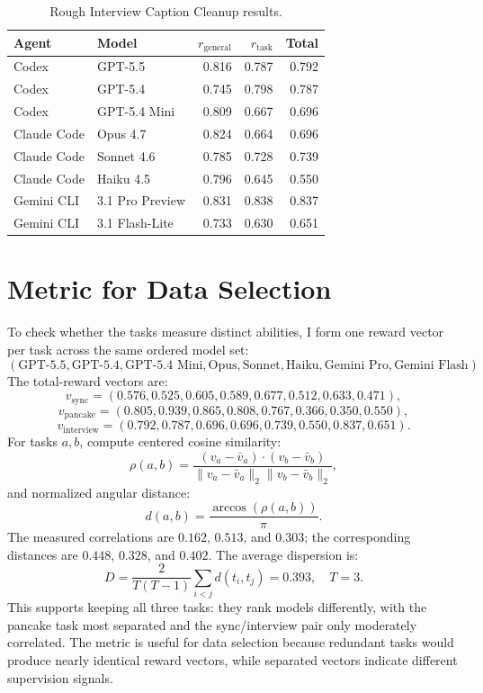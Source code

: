 \documentclass[11pt]{article}
\begin{document}
\begin{table}[H]
\centering
\small
\begin{tabular}{llrrr}
\toprule
Agent & Model & \(r_{\mathrm{general}}\) & \(r_{\mathrm{task}}\) & Total \\
\midrule
Codex & GPT-5.5 & 0.816 & 0.787 & 0.792 \\
Codex & GPT-5.4 & 0.745 & 0.798 & 0.787 \\
Codex & GPT-5.4 Mini & 0.809 & 0.667 & 0.696 \\
Claude Code & Opus 4.7 & 0.824 & 0.664 & 0.696 \\
Claude Code & Sonnet 4.6 & 0.785 & 0.728 & 0.739 \\
Claude Code & Haiku 4.5 & 0.796 & 0.645 & 0.550 \\
Gemini CLI & 3.1 Pro Preview & 0.831 & 0.838 & 0.837 \\
Gemini CLI & 3.1 Flash-Lite & 0.733 & 0.630 & 0.651 \\
\bottomrule
\end{tabular}
\caption{Rough Interview Caption Cleanup results.}
\end{table}

\section{Metric for Data Selection}

To check whether the tasks measure distinct abilities, I form one reward vector per task across the same ordered model set:
\[
( \text{GPT-5.5}, \text{GPT-5.4}, \text{GPT-5.4 Mini}, \text{Opus}, \text{Sonnet}, \text{Haiku}, \text{Gemini Pro}, \text{Gemini Flash} ).
\]
The total-reward vectors are:
\[
v_{\mathrm{sync}}=(0.576,0.525,0.605,0.589,0.677,0.512,0.633,0.471),
\]
\[
v_{\mathrm{pancake}}=(0.805,0.939,0.865,0.808,0.767,0.366,0.350,0.550),
\]
\[
v_{\mathrm{interview}}=(0.792,0.787,0.696,0.696,0.739,0.550,0.837,0.651).
\]
For tasks \(a,b\), compute centered cosine similarity:
\[
\rho(a,b)=\frac{(v_a-\bar v_a)\cdot(v_b-\bar v_b)}
{\|v_a-\bar v_a\|_2\|v_b-\bar v_b\|_2},
\]
and normalized angular distance:
\[
d(a,b)=\frac{\arccos(\rho(a,b))}{\pi}.
\]
The measured correlations are \(0.162\), \(0.513\), and \(0.303\); the corresponding distances are \(0.448\), \(0.328\), and \(0.402\). The average dispersion is:
\[
D=\frac{2}{T(T-1)}\sum_{i<j}d(t_i,t_j)=0.393,\quad T=3.
\]
This supports keeping all three tasks: they rank models differently, with the pancake task most separated and the sync/interview pair only moderately correlated. The metric is useful for data selection because redundant tasks would produce nearly identical reward vectors, while separated vectors indicate different supervision signals.
\end{document}
